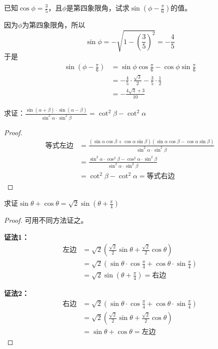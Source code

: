 \begin{example}
已知$\cos\phi=\frac{3}{5}$，且$\phi$是第四象限角，试求$\sin\left(\phi-\frac{\pi}{6}\right)$的值。
\end{example}

\begin{solution}
因为$\phi$为第四象限角，所以
\[\sin\phi=-\sqrt{1-\left(\frac{3}{5}\right)^2}=-\frac{4}{5}\]
于是
\[\begin{split}
    \sin\left(\phi-\frac{\pi}{6}\right)&=\sin\phi\cos\frac{\pi}{6}-\cos\phi\sin\frac{\pi}{6}\\
    &=-\frac{4}{5}\cdot \frac{\sqrt{3}}{2}-\frac{3}{5}\cdot\frac{1}{2}\\
    &=-\frac{4\sqrt{3}+3}{10}
\end{split}\]
\end{solution}

\begin{example}
    求证：$\frac{\sin(\alpha+\beta)\cdot \sin(\alpha-\beta)}{\sin^2\alpha\cdot \sin^2\beta}=\cot^2\beta-\cot^2\alpha$
\end{example}

\begin{proof}
\[\begin{split}
\text{等式左边}&=\frac{(\sin\alpha\cos\beta+\cos\alpha\sin\beta)(\sin\alpha\cos\beta-\cos\alpha\sin\beta)}{\sin^2\alpha\cdot \sin^2\beta}\\
&=\frac{\sin^2\alpha\cdot \cos^2\beta-\cos^2\alpha\cdot \sin^2\beta}{\sin^2\alpha\cdot \sin^2\beta}\\
&=\cot^2\beta-\cot^2\alpha=\text{等式右边}
\end{split}\]
\end{proof}

\begin{example}
求证$\sin\theta+\cos\theta=\sqrt{2}\sin\left(\theta+\frac{\pi}{4}\right)$
\end{example}

\begin{proof}
可用不同方法证之。

\textbf{证法1：}
\[\begin{split}
\text{左边}&=\sqrt{2}\left(\frac{\sqrt{2}}{2}\sin\theta+\frac{\sqrt{2}}{2}\cos\theta\right)\\
&=\sqrt{2}\left(\sin\theta\cdot \cos\frac{\pi}{4}+\cos\theta\cdot\sin\frac{\pi}{4}\right)\\
&=\sqrt{2}\sin\left(\theta+\frac{\pi}{4}\right)=\text{右边}    
\end{split}\]

\textbf{证法2：}
\[\begin{split}
\text{右边}&=\sqrt{2}\left(\sin\theta\cdot \cos\frac{\pi}{4}+\cos\theta\cdot\sin\frac{\pi}{4}\right)\\
&=\sqrt{2}\left(\frac{\sqrt{2}}{2}\sin\theta+\frac{\sqrt{2}}{2}\cos\theta\right)\\
&=\sin\theta+\cos\theta=\text{左边}
\end{split}\]
\end{proof}


